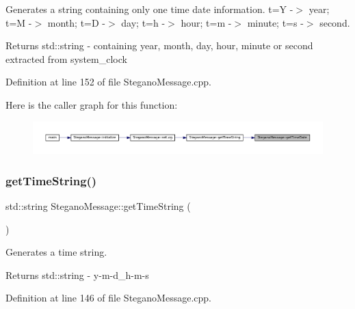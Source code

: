 Generates a string containing only one time date information. t=Y -\/$>$ year; t=M -\/$>$ month; t=D -\/$>$ day; t=h -\/$>$ hour; t=m -\/$>$ minute; t=s -\/$>$ second. 

\begin{DoxyReturn}{Returns}
std\+::string -\/ containing year, month, day, hour, minute or second extracted from system\+\_\+clock 
\end{DoxyReturn}


Definition at line 152 of file Stegano\+Message.\+cpp.

Here is the caller graph for this function\+:\nopagebreak
\begin{figure}[H]
\begin{center}
\leavevmode
\includegraphics[width=350pt]{classSteganoMessage_a9aaa5e476220c95e1a68b4d722de43b1_icgraph}
\end{center}
\end{figure}
\mbox{\label{classSteganoMessage_a9771a4abc2d7a5a2a8cfb1684f7f313f}} 
\subsubsection{\texorpdfstring{getTimeString()}{getTimeString()}}
{\footnotesize\ttfamily std\+::string Stegano\+Message\+::get\+Time\+String (\begin{DoxyParamCaption}{ }\end{DoxyParamCaption})\hspace{0.3cm}{\ttfamily [static]}}



Generates a time string. 

\begin{DoxyReturn}{Returns}
std\+::string -\/ y-\/m-\/d\+\_\+h-\/m-\/s 
\end{DoxyReturn}


Definition at line 146 of file Stegano\+Message.\+cpp.

